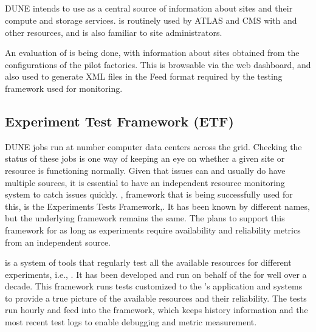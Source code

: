 \documentclass[../main-v1.tex]{subfiles}
\begin{document}
\subsection{} %

DUNE intends to use   as a central source of information about sites and their compute and storage services.  is routinely used by ATLAS and CMS with  and other  resources, and is also familiar to site administrators. 

An evaluation of  is being done, with information about sites obtained from the configurations of the  pilot factories. This is browsable via the  web dashboard, and also used to generate XML files in the  Feed format required by the  testing framework used for monitoring.

\subsection{Experiment Test Framework (ETF)}

DUNE jobs run at number computer data centers across the grid. Checking the status of these jobs is one way of keeping an eye on whether a given site or resource is functioning normally. Given that issues can and usually do have multiple sources, it is essential to have an independent resource monitoring system to %
catch issues quickly. %
, framework that is being successfully used for this, is the  %
 Experiments Tests Framework\cite{bib:ETFDoc},\cite{bib:ETFStatus}. It  has been known by different names, but the underlying framework remains the same. The  plans to support this framework for as long as  experiments require availability and reliability metrics from an independent source.
 
 is a system of tools that regularly test all the available resources for different experiments, i.e., . It has been developed and run on behalf of the  %
  for well over a decade. %
This framework runs tests customized to the 's application and systems to provide a true picture of the  available resources and their reliability. The  tests run hourly and feed into the  
framework, which keeps history information and the most recent test logs to enable debugging and metric measurement.
\end{document}

